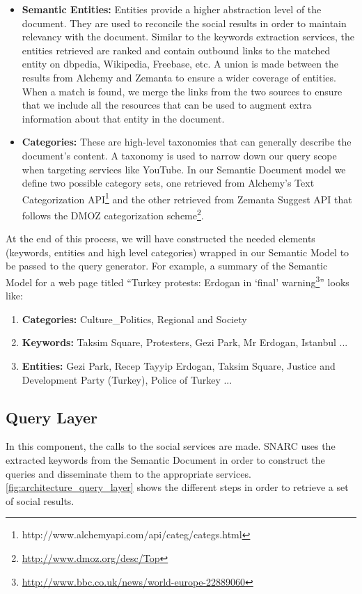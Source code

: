 \documentclass[oribibl]{../../Tools/LaTEX/llncs}
\begin{document}
\begin{enumerate}
\begin{itemize}
\item {\bf Semantic Entities:} Entities provide a higher abstraction level of the document. They are used to reconcile the social results in order to maintain relevancy with the document. Similar to the keywords extraction services, the entities retrieved are ranked and contain outbound links to the matched entity on dbpedia, Wikipedia, Freebase, etc. A union is made between the results from Alchemy and Zemanta to ensure a wider coverage of entities. When a match is found, we merge the links from the two sources to ensure that we include all the resources that can be used to augment extra information about that entity in the document.
\item {\bf Categories:} These are high-level taxonomies that can generally describe the document's content. A taxonomy is used to narrow down our query scope when targeting services like YouTube. In our Semantic Document model we define two possible category sets, one retrieved from Alchemy's Text Categorization API\footnote{http://www.alchemyapi.com/api/categ/categs.html} and the other retrieved from Zemanta Suggest API that follows the DMOZ categorization scheme\footnote{\url{http://www.dmoz.org/desc/Top}}.
\end{itemize}
\end{enumerate}

At the end of this process, we will have constructed the needed elements (keywords, entities and high level categories) wrapped in our Semantic Model to be passed to the query generator. For example, a summary of the Semantic Model for a web page titled ``Turkey protests: Erdogan in `final' warning\footnote{\url{http://www.bbc.co.uk/news/world-europe-22889060}}'' looks like:
\begin{enumerate}
\item {\bf Categories:} Culture\_Politics, Regional and Society
\item {\bf Keywords:} Taksim Square, Protesters, Gezi Park, Mr Erdogan, Istanbul ...
\item {\bf Entities:} Gezi Park, Recep Tayyip Erdogan, Taksim Square, Justice and Development Party (Turkey), Police of Turkey ...
\end{enumerate}

\subsection{Query Layer}
In this component, the calls to the social services are made. SNARC uses the extracted keywords from the Semantic Document in order to construct the queries and disseminate them to the appropriate services. \ref{fig:architecture_query_layer} shows the different steps in order to retrieve a set of social results.
\end{document}
